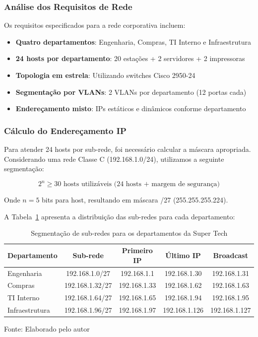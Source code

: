 \subsubsection{Análise dos Requisitos de Rede}

Os requisitos especificados para a rede corporativa incluem:

\begin{itemize}
    \item \textbf{Quatro departamentos}: Engenharia, Compras, TI Interno e Infraestrutura
    \item \textbf{24 hosts por departamento}: 20 estações + 2 servidores + 2 impressoras
    \item \textbf{Topologia em estrela}: Utilizando switches Cisco 2950-24
    \item \textbf{Segmentação por VLANs}: 2 VLANs por departamento (12 portas cada)
    \item \textbf{Endereçamento misto}: IPs estáticos e dinâmicos conforme departamento
\end{itemize}

\subsubsection{Cálculo do Endereçamento IP}

Para atender 24 hosts por sub-rede, foi necessário calcular a máscara apropriada. Considerando uma rede Classe C (192.168.1.0/24), utilizamos a seguinte segmentação:

\begin{equation}
2^n \geq 30 \text{ hosts utilizáveis (24 hosts + margem de segurança)}
\end{equation}

Onde $n = 5$ bits para host, resultando em máscara /27 (255.255.255.224).

A Tabela~\ref{tab:subredes_supertech} apresenta a distribuição das sub-redes para cada departamento:

\begin{table}[H]
\centering
\caption{Segmentação de sub-redes para os departamentos da Super Tech}
\begin{tabular}{|l|c|c|c|c|}
\hline
\textbf{Departamento} & \textbf{Sub-rede} & \textbf{Primeiro IP} & \textbf{Último IP} & \textbf{Broadcast} \\
\hline
Engenharia & 192.168.1.0/27 & 192.168.1.1 & 192.168.1.30 & 192.168.1.31 \\
\hline
Compras & 192.168.1.32/27 & 192.168.1.33 & 192.168.1.62 & 192.168.1.63 \\
\hline
TI Interno & 192.168.1.64/27 & 192.168.1.65 & 192.168.1.94 & 192.168.1.95 \\
\hline
Infraestrutura & 192.168.1.96/27 & 192.168.1.97 & 192.168.1.126 & 192.168.1.127 \\
\hline
\end{tabular}
\label{tab:subredes_supertech}
{\fontsize{10pt}{\baselineskip}\selectfont
Fonte: Elaborado pelo autor}
\end{table}

